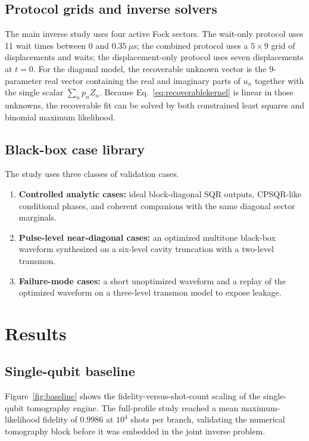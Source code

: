 \documentclass[11pt]{article}
\begin{document}
\subsection{Protocol grids and inverse solvers}
The main inverse study uses four active Fock sectors. The wait-only protocol
uses 11 wait times between $0$ and $0.35~\mu\mathrm{s}$; the combined protocol
uses a $5\times 9$ grid of displacements and waits; the displacement-only
protocol uses seven displacements at $t=0$. For the diagonal model, the
recoverable unknown vector is the $9$-parameter real vector containing the real
and imaginary parts of $u_n$ together with the single scalar
$\sum_n p_n Z_n$. Because Eq.~\eqref{eq:recoverablekernel} is linear in those
unknowns, the recoverable fit can be solved by both constrained least squares
and binomial maximum likelihood.

\subsection{Black-box case library}
The study uses three classes of validation cases.
\begin{enumerate}[label=\arabic*.]
\item \textbf{Controlled analytic cases:} ideal block-diagonal SQR outputs,
CPSQR-like conditional phases, and coherent companions with the same diagonal
sector marginals.
\item \textbf{Pulse-level near-diagonal cases:} an optimized multitone
black-box waveform synthesized on a six-level cavity truncation with a
two-level transmon.
\item \textbf{Failure-mode cases:} a short unoptimized waveform and a replay of
the optimized waveform on a three-level transmon model to expose leakage.
\end{enumerate}

\section{Results}
\subsection{Single-qubit baseline}
Figure~\ref{fig:baseline} shows the fidelity-versus-shot-count scaling of the
single-qubit tomography engine. The full-profile study reached a mean
maximum-likelihood fidelity of $0.9986$ at $10^4$ shots per branch, validating
the numerical tomography block before it was embedded in the joint inverse
problem.
\end{document}
